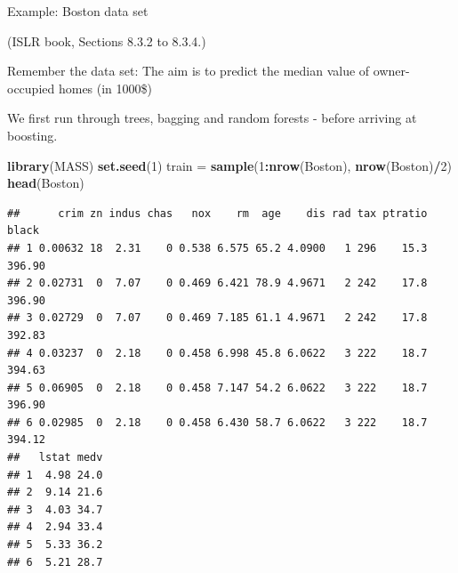 \documentclass[10pt,ignorenonframetext,]{beamer}
\newenvironment{Shaded}{\begin{snugshade}}{\end{snugshade}}
\newcommand{\KeywordTok}[1]{\textcolor[rgb]{0.13,0.29,0.53}{\textbf{#1}}}
\newcommand{\DecValTok}[1]{\textcolor[rgb]{0.00,0.00,0.81}{#1}}
\newcommand{\StringTok}[1]{\textcolor[rgb]{0.31,0.60,0.02}{#1}}
\newcommand{\OperatorTok}[1]{\textcolor[rgb]{0.81,0.36,0.00}{\textbf{#1}}}
\newcommand{\NormalTok}[1]{#1}
\begin{document}
\begin{frame}[fragile]{Example: Boston data set}

\tiny
(ISLR book, Sections 8.3.2 to 8.3.4.)

\normalsize
Remember the data set: The aim is to predict the median value of
owner-occupied homes (in 1000\$)

We first run through trees, bagging and random forests - before arriving
at boosting.

\scriptsize

\begin{Shaded}
\begin{Highlighting}[]
\KeywordTok{library}\NormalTok{(MASS)}
\KeywordTok{set.seed}\NormalTok{(}\DecValTok{1}\NormalTok{)}
\NormalTok{train =}\StringTok{ }\KeywordTok{sample}\NormalTok{(}\DecValTok{1}\OperatorTok{:}\KeywordTok{nrow}\NormalTok{(Boston), }\KeywordTok{nrow}\NormalTok{(Boston)}\OperatorTok{/}\DecValTok{2}\NormalTok{)}
\KeywordTok{head}\NormalTok{(Boston)}
\end{Highlighting}
\end{Shaded}

\begin{verbatim}
##      crim zn indus chas   nox    rm  age    dis rad tax ptratio  black
## 1 0.00632 18  2.31    0 0.538 6.575 65.2 4.0900   1 296    15.3 396.90
## 2 0.02731  0  7.07    0 0.469 6.421 78.9 4.9671   2 242    17.8 396.90
## 3 0.02729  0  7.07    0 0.469 7.185 61.1 4.9671   2 242    17.8 392.83
## 4 0.03237  0  2.18    0 0.458 6.998 45.8 6.0622   3 222    18.7 394.63
## 5 0.06905  0  2.18    0 0.458 7.147 54.2 6.0622   3 222    18.7 396.90
## 6 0.02985  0  2.18    0 0.458 6.430 58.7 6.0622   3 222    18.7 394.12
##   lstat medv
## 1  4.98 24.0
## 2  9.14 21.6
## 3  4.03 34.7
## 4  2.94 33.4
## 5  5.33 36.2
## 6  5.21 28.7
\end{verbatim}

\end{frame}
\end{document}
